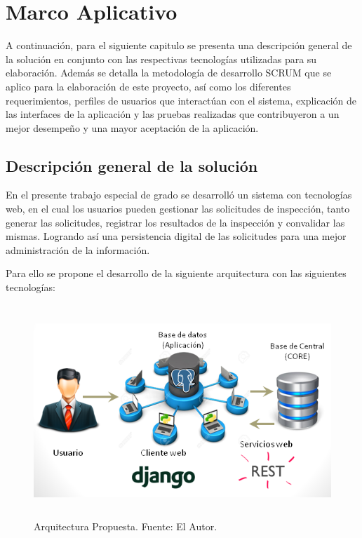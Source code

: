 \chapter{Marco Aplicativo}
\setlength{\parskip}{5mm}
A continuación, para el siguiente capitulo se presenta una descripción general de la solución en conjunto con las respectivas tecnologías utilizadas para su elaboración. Además se detalla la metodología de desarrollo SCRUM que se aplico para la elaboración de este proyecto, así como los diferentes requerimientos, perfiles de usuarios que interactúan con el sistema, explicación de las interfaces de la aplicación y las pruebas realizadas que contribuyeron a un mejor desempeño y una mayor aceptación de la aplicación. 

\setlength{\parskip}{0mm}

\section{Descripción general de la solución} 
\setlength{\parskip}{5mm}

En el presente trabajo especial de grado se desarrolló un sistema con tecnologías web, en el cual los usuarios pueden gestionar las solicitudes de inspección, tanto generar las solicitudes, registrar los resultados de la inspección y convalidar las mismas. Logrando así una persistencia digital de las solicitudes para una mejor administración de la información.

Para ello se propone el desarrollo de la siguiente arquitectura con las siguientes tecnologías:

\newpage
\begin{figure}[H]
\begin{center}
	\includegraphics[width=15cm,height=8cm]{img/con_tecnologia1.png}
\end{center}
\caption{Arquitectura Propuesta. Fuente: El Autor.}
\label{fig:Con_Tec}
\end{figure}

